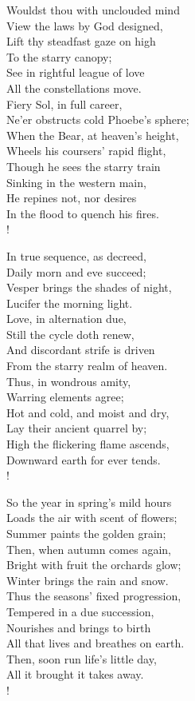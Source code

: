 \documentclass[12pt]{book}
\newenvironment{ipoem}[1]%
  {\setcounter{poemindentevery}{#1}\begin{poem}\small}%
  {\end{poem}\setcounter{poemindentevery}{0}}
\begin{document}
\begin{ipoem}{0}
    Wouldst thou with unclouded mind \\
    View the laws by God designed, \\
    Lift thy steadfast gaze on high \\
    To the starry canopy; \\
    See in rightful league of love \\
    All the constellations move. \\
    Fiery Sol, in full career, \\
    Ne'er obstructs cold Phoebe's sphere; \\
    When the Bear, at heaven's height, \\
    Wheels his coursers' rapid flight, \\
    Though he sees the starry train \\
    Sinking in the western main, \\
    He repines not, nor desires \\
    In the flood to quench his fires. \\!

    In true sequence, as decreed, \\
    Daily morn and eve succeed; \\
    Vesper brings the shades of night, \\
    Lucifer the morning light. \\
    Love, in alternation due, \\
    Still the cycle doth renew, \\
    And discordant strife is driven \\
    From the starry realm of heaven. \\
    Thus, in wondrous amity, \\
    Warring elements agree; \\
    Hot and cold, and moist and dry, \\
    Lay their ancient quarrel by; \\
    High the flickering flame ascends, \\
    Downward earth for ever tends. \\!

    So the year in spring's mild hours \\
    Loads the air with scent of flowers; \\
    Summer paints the golden grain; \\
    Then, when autumn comes again, \\
    Bright with fruit the orchards glow; \\
    Winter brings the rain and snow. \\
    Thus the seasons' fixed progression, \\
    Tempered in a due succession, \\
    Nourishes and brings to birth \\
    All that lives and breathes on earth. \\
    Then, soon run life's little day, \\
    All it brought it takes away. \\!


\end{ipoem}
\end{document}
